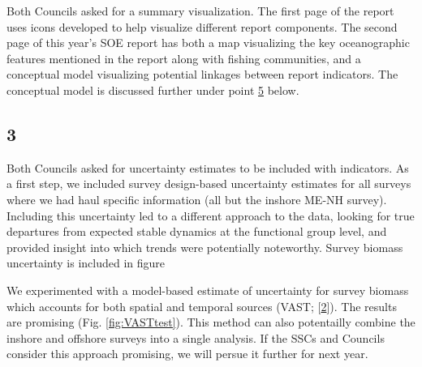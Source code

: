 \documentclass[10pt,]{article}
\begin{document}
Both Councils asked for a summary visualization. The first page of the
report uses icons developed to help visualize different report
components. The second page of this year's SOE report has both a map
visualizing the key oceanographic features mentioned in the report along
with fishing communities, and a conceptual model visualizing potential
linkages between report indicators. The conceptual model is discussed
further under point \protect\hyperlink{5}{5} below.

\hypertarget{section-2}{%
\subsection{3}\label{section-2}}

Both Councils asked for uncertainty estimates to be included with
indicators. As a first step, we included survey design-based uncertainty
estimates for all surveys where we had haul specific information (all
but the inshore ME-NH survey). Including this uncertainty led to a
different approach to the data, looking for true departures from
expected stable dynamics at the functional group level, and provided
insight into which trends were potentially noteworthy. Survey biomass
uncertainty is included in figure

We experimented with a model-based estimate of uncertainty for survey
biomass which accounts for both spatial and temporal sources (VAST;
{[}\protect\hyperlink{ref-thorson_guidance_2019}{2}{]}). The results are
promising (Fig. \ref{fig:VASTtest}). This method can also potentailly
combine the inshore and offshore surveys into a single analysis. If the
SSCs and Councils consider this approach promising, we will persue it
further for next year.
\end{document}
